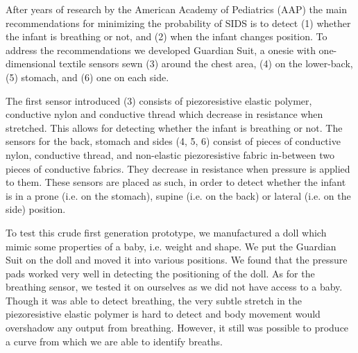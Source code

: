 \documentclass{sigchi-ext}
\begin{document}
After years of research by the American Academy of Pediatrics (AAP) \cite{aap-1992,aap-1996,aap-2005} the main recommendations for minimizing the probability of SIDS is to detect (1) whether the infant is breathing or not, and (2) when the infant changes position. To address the recommendations we developed Guardian Suit, a onesie with one-dimensional textile sensors sewn (3) around the chest area, (4) on the lower-back, (5) stomach, and (6) one on each side.

The first sensor introduced (3) consists of piezoresistive elastic polymer, conductive
nylon and conductive thread which decrease in resistance when stretched. This allows for detecting whether
the infant is breathing or not. The sensors for the back, stomach and sides (4, 5, 6) consist of pieces of conductive nylon, conductive thread, and non-elastic piezoresistive fabric in-between two pieces of conductive fabrics. They decrease in resistance when pressure is applied to them. 
These sensors are placed as such, in order to detect whether the infant is in a
prone (i.e. on the stomach), supine (i.e. on the back) or lateral (i.e. on the
side) position.

To test this crude first generation prototype, we manufactured a doll which 
mimic some properties of a baby, i.e. weight and shape. We put the Guardian Suit
on the doll and moved it into various positions. We found that the pressure pads
worked very well in detecting the positioning of the doll. As for the breathing
sensor, we tested it on ourselves as we did not have access to a baby. Though
it was able to detect breathing, the very subtle stretch in the piezoresistive
elastic polymer is hard to detect and body movement would overshadow any output
from breathing. However, it still was possible to produce a curve from which 
we are able to identify breaths.
\end{document}
